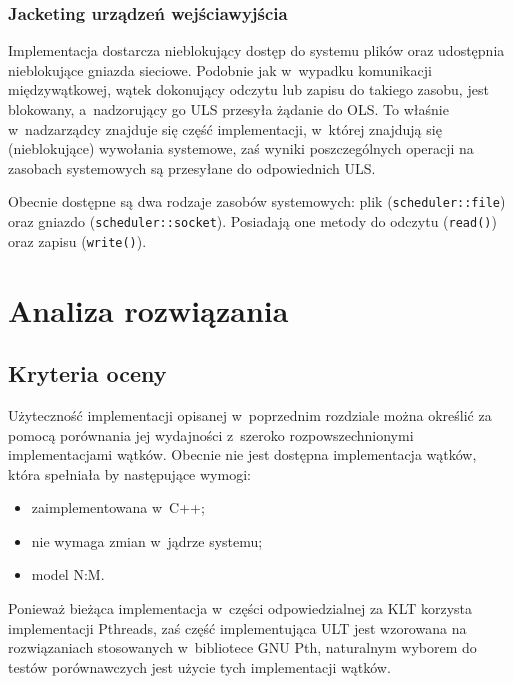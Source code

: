 \documentclass[12pt,makeidx]{mwart}
\newcommand{\code}{\texttt}
\newcommand{\dcolon}{::}
\newcommand{\procbr}{()}
\begin{document}
\subsubsection{Jacketing urządzeń wejścia\dywiz wyjścia}
\indent
	Implementacja dostarcza nieblokujący dostęp do systemu plików oraz udostępnia nieblokujące gniazda sieciowe.
	Podobnie jak w~wypadku komunikacji międzywątkowej, wątek dokonujący odczytu lub zapisu do takiego zasobu, jest blokowany,
	a~nadzorujący go ULS przesyła żądanie do OLS.
	To właśnie w~nad\dywiz zarządcy znajduje się część implementacji, w~której znajdują się (nieblokujące) wywołania systemowe,
	zaś wyniki poszczególnych operacji na zasobach systemowych są przesyłane do odpowiednich ULS.
\par
%
\indent
	Obecnie dostępne są dwa rodzaje zasobów systemowych: plik \linebreak (\code{scheduler\dcolon file}) oraz gniazdo (\code{scheduler\dcolon socket}).
	Posiadają one metody do odczytu (\code{read\procbr}) oraz zapisu (\code{write\procbr}).
\par
%
\newpage
\section{Analiza rozwiązania}
\label{sec:analysis}
\subsection{Kryteria oceny}
\indent
	Użyteczność implementacji opisanej w~poprzednim rozdziale można określić za pomocą porównania jej wydajności z~szeroko rozpowszechnionymi
	implementacjami wątków. Obecnie nie jest dostępna implementacja wątków, która spełniała by następujące wymogi:
	\begin{itemize}
		\item zaimplementowana w~C++;
		\item nie wymaga zmian w~jądrze systemu;
		\item model N:M.
	\end{itemize}
	Ponieważ bieżąca implementacja w~części odpowiedzialnej za KLT korzysta implementacji Pthreads, zaś część implementująca ULT
	jest wzorowana na rozwiązaniach stosowanych w~bibliotece GNU Pth, naturalnym wyborem do testów porównawczych jest
	użycie tych implementacji wątków.
\par
%
\end{document}

